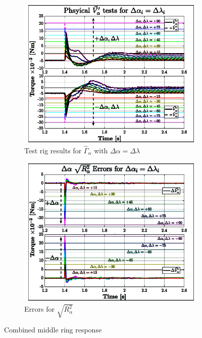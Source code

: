 \begin{figure}[htbp]
\centering
\begin{subfigure}{0.49\textwidth}
\centering
\includegraphics[width=\textwidth]{graphs/tau-alph-lam}
\caption{Test rig results for $\hat{\Gamma}_\alpha$ with $\Delta\alpha=\Delta\lambda$}
\label{fig:tau-alpha-lam}
\end{subfigure}
\begin{subfigure}{0.49\textwidth}
\centering
\includegraphics[width=\textwidth]{graphs/tau-alph-lam-r}
\caption{Errors for $\sqrt{R^2_{\alpha}}$}
\label{fig:tau-alpha-lam-r}
\end{subfigure}
\vspace{-8pt}
\caption{Combined middle ring response}
\label{fig:tau-alpha-lam-response-test}
\vspace{-16pt}
\end{figure}
